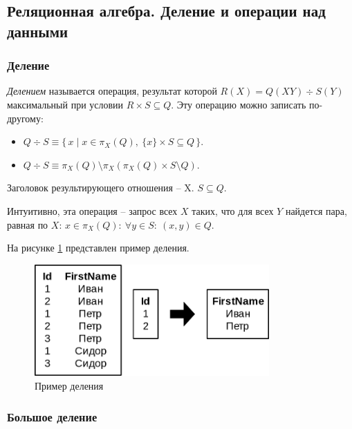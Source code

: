 \subsection{Реляционная алгебра. Деление и операции над данными}

\subsubsection{Деление}

\begin{definition}
	\textit{Делением}	называется операция, результат которой $R(X) = Q(XY) \div S(Y)$
	максимальный при условии $R \times S \subseteq Q$. Эту операцию можно записать по-другому:
	\begin{itemize}
		\item $Q \div S \equiv \{\,x \mid x \in \pi_X(Q),~ \{x\} \times S \subseteq Q\,\}$.
		\item $Q \div S \equiv \pi_X(Q) \setminus \pi_X(\pi_X(Q) \times S \setminus Q)$.
	\end{itemize}
	Заголовок результирующего отношения -- X. $S \subseteq Q$.
\end{definition}

\begin{remark}
	Интуитивно, эта операция -- запрос всех $X$ таких, что для всех
	$Y$ найдется пара, равная по $X$: $x \in \pi_X(Q)\colon~ \forall y \in S\colon~ (x, y) \in Q$.
\end{remark}

На рисунке \ref{div-ex} представлен пример деления.

\begin{figure}[H]
	\centering
	\includegraphics[width=0.8\textwidth]{../assets/kgeorgiy/relalgebra/Divide_Example_2.svg.png}
	\caption{Пример деления}
	\label{div-ex}
\end{figure}

\subsubsection{Большое деление}

